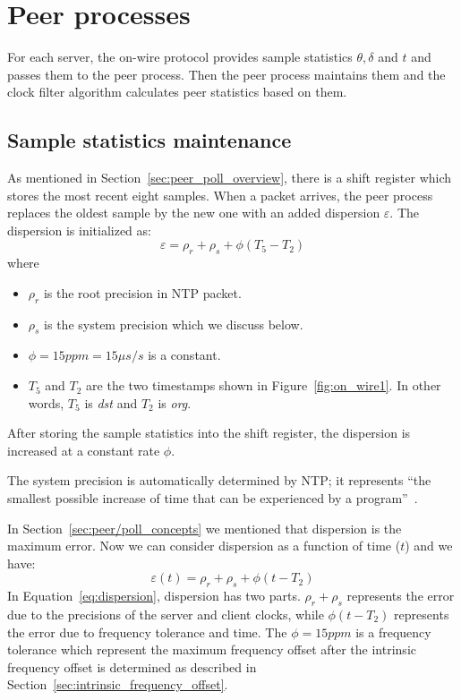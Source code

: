 \section{Peer processes}%
\label{sec:peer_processes}
For each server, the on-wire protocol provides sample statistics $\theta,
\delta$ and $t$ and passes them to the peer process. Then the peer process
maintains them and the clock filter algorithm calculates peer statistics based
on them.

\subsection{Sample statistics maintenance}%
\label{sub:sample_statistics_maintenance}
As mentioned in Section~\ref{sec:peer_poll_overview}, there is a shift register
which stores the most recent eight samples. When a packet arrives, the peer
process replaces the oldest sample by the new one with an added dispersion
$\varepsilon$.
The dispersion is initialized as:
$$ \varepsilon = \rho_r + \rho_s + \phi (T_5 - T_2) $$
where 
\begin{itemize}
    \item 
        $\rho_r$ is the root precision in NTP packet. 
    \item 
        $\rho_s$ is the system
        precision which we discuss below.
    \item
        $\phi = 15 ppm = 15 \mu s/s$ is a constant.
    \item
        $T_5$ and $T_2$ are the two timestamps shown in
        Figure~\ref{fig:on_wire1}. In other words, $T_5$ is \emph{dst} and
        $T_2$ is \emph{org}.
\end{itemize}
After storing the sample statistics into the shift register, the dispersion
is increased at a constant rate $\phi$. 

The system precision is automatically determined by NTP; it represents 
``the smallest possible increase of time that can be experienced by a
program''~\cite{precision}.

In Section~\ref{sec:peer/poll_concepts} we mentioned that dispersion is the
maximum error. Now we can consider dispersion as a function of time ($t$) and
we have:
\begin{equation}
    \varepsilon(t) = \rho_r + \rho_s + \phi (t - T_2)
    \label{eq:dispersion}
\end{equation}
In Equation~\ref{eq:dispersion}, dispersion has two parts. $\rho_r + \rho_s$
represents the error due to the precisions of the server and client clocks,
while $\phi (t - T_2)$ represents the error due to frequency tolerance and
time.  The $\phi = 15ppm$ is a frequency tolerance which represent the maximum
frequency offset after the intrinsic frequency offset is determined as
described in Section~\ref{sec:intrinsic_frequency_offset}.

